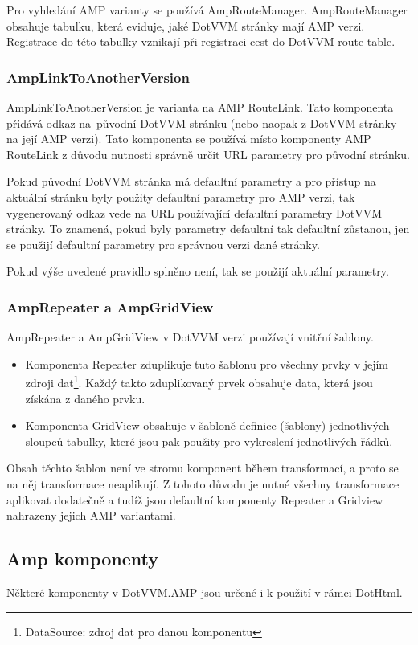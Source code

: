 Pro vyhledání AMP varianty se používá AmpRouteManager. AmpRouteManager obsahuje tabulku, která eviduje, jaké DotVVM stránky mají AMP verzi. Registrace do této tabulky vznikají při registraci cest do DotVVM route table.

\subsubsection*{AmpLinkToAnotherVersion}
AmpLinkToAnotherVersion je varianta na AMP RouteLink. Tato komponenta přidává odkaz na~původní DotVVM stránku (nebo naopak z DotVVM stránky na její AMP verzi). Tato komponenta se používá místo komponenty AMP RouteLink z důvodu nutnosti správně určit URL parametry pro původní stránku.

Pokud původní DotVVM stránka má defaultní parametry a pro přístup na aktuální stránku byly použity defaultní parametry pro AMP verzi, tak vygenerovaný odkaz vede na URL používající defaultní parametry DotVVM stránky. To znamená, pokud byly parametry defaultní tak defaultní zůstanou, jen se použijí defaultní parametry pro správnou verzi dané stránky.

Pokud výše uvedené pravidlo splněno není, tak se použijí aktuální parametry.

\subsubsection*{AmpRepeater a AmpGridView}
AmpRepeater a AmpGridView v DotVVM verzi používají vnitřní šablony.

\begin{itemize}
    \item Komponenta Repeater zduplikuje tuto šablonu pro všechny prvky v jejím zdroji dat\footnote{DataSource: zdroj dat pro danou komponentu}. Každý takto zduplikovaný prvek obsahuje data, která jsou získána z daného prvku.
    \item Komponenta GridView obsahuje v šabloně definice (šablony) jednotlivých sloupců tabulky, které jsou pak použity pro vykreslení jednotlivých řádků.
\end{itemize}

Obsah těchto šablon není ve stromu komponent během transformací, a proto se na něj transformace neaplikují. Z tohoto důvodu je nutné všechny transformace aplikovat dodatečně a tudíž jsou defaultní komponenty Repeater a Gridview nahrazeny jejich AMP variantami.

\subsection*{Amp komponenty}
 Některé komponenty v DotVVM.AMP jsou určené i k použití v rámci DotHtml.
